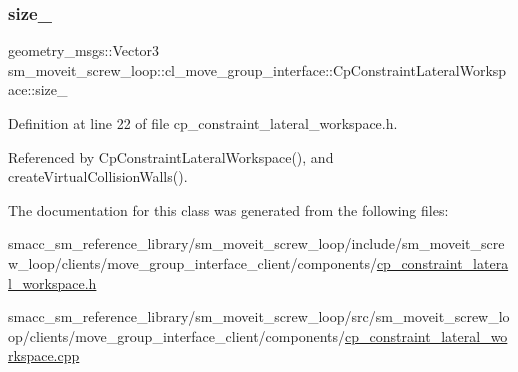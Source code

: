 \subsubsection{\texorpdfstring{size\+\_\+}{size\_}}
{\footnotesize\ttfamily geometry\+\_\+msgs\+::\+Vector3 sm\+\_\+moveit\+\_\+screw\+\_\+loop\+::cl\+\_\+move\+\_\+group\+\_\+interface\+::\+Cp\+Constraint\+Lateral\+Workspace\+::size\+\_\+\hspace{0.3cm}{\ttfamily [private]}}



Definition at line 22 of file cp\+\_\+constraint\+\_\+lateral\+\_\+workspace.\+h.



Referenced by Cp\+Constraint\+Lateral\+Workspace(), and create\+Virtual\+Collision\+Walls().



The documentation for this class was generated from the following files\+:\begin{DoxyCompactItemize}
\item 
smacc\+\_\+sm\+\_\+reference\+\_\+library/sm\+\_\+moveit\+\_\+screw\+\_\+loop/include/sm\+\_\+moveit\+\_\+screw\+\_\+loop/clients/move\+\_\+group\+\_\+interface\+\_\+client/components/\hyperlink{sm__moveit__screw__loop_2include_2sm__moveit__screw__loop_2clients_2move__group__interface__clie70cf5f21efeb889fca648454dbab3ddb}{cp\+\_\+constraint\+\_\+lateral\+\_\+workspace.\+h}\item 
smacc\+\_\+sm\+\_\+reference\+\_\+library/sm\+\_\+moveit\+\_\+screw\+\_\+loop/src/sm\+\_\+moveit\+\_\+screw\+\_\+loop/clients/move\+\_\+group\+\_\+interface\+\_\+client/components/\hyperlink{sm__moveit__screw__loop_2src_2sm__moveit__screw__loop_2clients_2move__group__interface__client_2978e5b304700e755730fdb2cde0545fa}{cp\+\_\+constraint\+\_\+lateral\+\_\+workspace.\+cpp}\end{DoxyCompactItemize}
